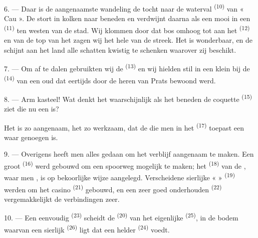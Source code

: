 \VUsaut{3.0mm}
\VUsaut{3.0mm}

6. --- Daar is de aangenaamste wandeling de tocht naar de waterval \textsuperscript{(10)} van
« Cau ». De  stort in kolken naar beneden en verdwijnt daarna als een mooi
 in een  \textsuperscript{(11)} ten westen van de stad. Wij
klommen door dat bos omhoog tot aan het 
\textsuperscript{(12)} en van de top van het  zagen wij het hele
 van de streek. Het  is wonderbaar, en de 
schijnt aan het land alle schatten kwistig te schenken waarover zij beschikt.

7. --- Om af te dalen gebruikten wij de  \textsuperscript{(13)} en wij
hielden stil in een klein  bij de
 \textsuperscript{(14)} van een oud  dat
eertijds door de heren van Prats bewoond werd.

8. --- Arm kasteel! Wat denkt het waarschijnlijk als het beneden de coquette
 \textsuperscript{(15)} ziet die nu een
 is?

Het  is zo aangenaam, het  zo werkzaam, dat de
 die men in het  \textsuperscript{(17)} toepast een waar
genoegen is.

\VUsaut{3.0mm}
\VUsaut{3.0mm}

9. --- Overigens heeft men alles gedaan om het verblijf aangenaam te maken. Een groot
 \textsuperscript{(16)} werd gebouwd om een spoorweg mogelijk te maken; het
 \textsuperscript{(18)} van de
, waar men , is op bekoorlijke
wijze aangelegd. Verscheidene sierlijke «  » \textsuperscript{(19)} werden om
het casino \textsuperscript{(21)} gebouwd, en een zeer goed onderhouden 
\textsuperscript{(22)} vergemakkelijkt de verbindingen zeer.

10. --- Een eenvoudig  \textsuperscript{(23)} scheidt de
 \textsuperscript{(20)} van het eigenlijke 
\textsuperscript{(25)}, in de bodem waarvan een sierlijk 
\textsuperscript{(26)} ligt dat een helder  \textsuperscript{(24)} voedt.

